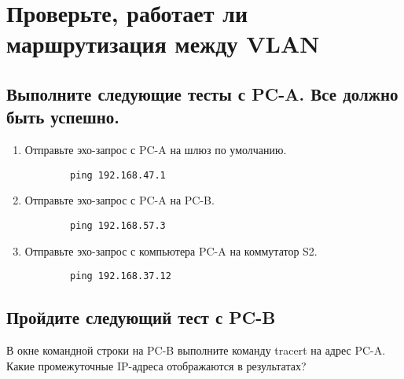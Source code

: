 \section{Проверьте, работает ли маршрутизация между VLAN}
\subsection{Выполните следующие тесты с PC-A. Все должно быть успешно.}
\begin{enumerate}[a]
    \item Отправьте эхо-запрос с PC-A на шлюз по умолчанию.
    \begin{verbatim}
        ping 192.168.47.1
    \end{verbatim}

    \item Отправьте эхо-запрос с PC-A на PC-B\@.
    \begin{verbatim}
        ping 192.168.57.3
    \end{verbatim}

    \item Отправьте эхо-запрос с компьютера PC-A на коммутатор S2.
    \begin{verbatim}
        ping 192.168.37.12
    \end{verbatim}
\end{enumerate}

\subsection{Пройдите следующий тест с PC-B}
В окне командной строки на PC-B выполните команду tracert на адрес PC-A.
Какие промежуточные IP-адреса отображаются в результатах?
